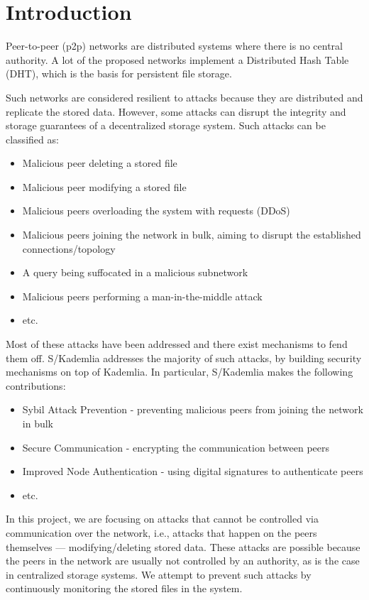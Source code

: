 \chapter{Introduction}
\label{chap:introduction}

Peer-to-peer (p2p) networks are distributed systems where there is no central authority.
A lot of the proposed networks implement a Distributed Hash Table (DHT), which is the basis for persistent file storage.

Such networks are considered resilient to attacks
because they are distributed and replicate the stored data.
However, some attacks can disrupt the integrity and
storage guarantees of a decentralized storage system.
Such attacks can be classified as:
\begin{itemize}
    \item Malicious peer deleting a stored file
    \item Malicious peer modifying a stored file
    \item Malicious peers overloading the system with requests (DDoS)
    \item Malicious peers joining the network in bulk, aiming to disrupt the established connections/topology
    \item A query being suffocated in a malicious subnetwork
    \item Malicious peers performing a man-in-the-middle attack
    \item etc.
\end{itemize}

Most of these attacks have been addressed and there exist mechanisms to fend them off.
S/Kademlia\cite{skademlia} addresses the majority of such attacks, by building security mechanisms on top of Kademlia\cite{kademlia}.
In particular, S/Kademlia makes the following contributions:
\begin{itemize}
    \item Sybil Attack Prevention - preventing malicious peers from joining the network in bulk
    \item Secure Communication - encrypting the communication between peers
    \item Improved Node Authentication - using digital signatures to authenticate peers
    \item etc.
\end{itemize}

In this project, we are focusing on attacks that cannot be controlled via communication over the network, i.e., attacks that happen on the peers themselves — modifying/deleting stored data.
These attacks are possible because the peers in the network are usually not controlled by an authority, as is the case in centralized storage systems.
We attempt to prevent such attacks by continuously monitoring the stored files in the system.

